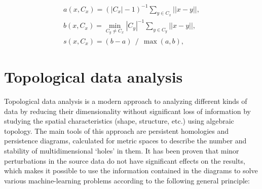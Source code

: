 \documentclass[shortAfour,times,sagev]{sagej}
\begin{document}
\begin{eqnarray}
    a(x, C_x) = {(|C_x| - 1)} ^ {-1} \sum_{y \in C_x} ||x - y||, \nonumber\\
    b(x, C_x) = \min_{C_y \ne C_x} {|C_y|} ^ {-1} \sum_{y \in C_y} ||x - y||, \nonumber\\
    s(x, C_x) = (b - a)~~/~~\max(a, b), \label{eq1}
\end{eqnarray}


\section{Topological data analysis}

Topological data analysis is a modern approach to analyzing different kinds of data by reducing their dimensionality without significant loss of information by studying the spatial characteristics (shape, structure, etc.) using algebraic topology. The main tools of this approach are persistent homologies and persistence diagrams, calculated for metric spaces to describe the number and stability of multidimensional `holes' in them. It has been proven that minor perturbations in the source data do not have significant effects on the results, which makes it possible to use the information contained in the diagrams to solve various machine-learning problems according to the following general principle:
\end{document}
